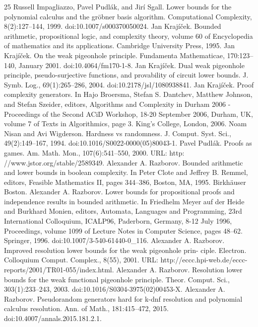 \documentclass[10pt,a4paper]{article}
\begin{document}
\begin{thebibliography}{25}
 Russell Impagliazzo, Pavel Pudlák, and Jirí Sgall. Lower bounds for the polynomial calculus and the gröbner basis algorithm. Computational Complexity, 8(2):127–144, 1999. doi:10.1007/s000370050024.
 Jan Krajíček. Bounded arithmetic, propositional logic, and complexity theory, volume 60 of Encyclopedia of mathematics and its applications. Cambridge University Press, 1995.
 Jan Krajíček. On the weak pigeonhole principle. Fundamenta Mathematicae, 170:123–140, January 2001. doi:10.4064/fm170-1-8.
 Jan Krajíček. Dual weak pigeonhole principle, pseudo-surjective functions, and provability of circuit lower bounds. J. Symb. Log., 69(1):265–286, 2004. doi:10.2178/jsl/1080938841.
 Jan Krajíček. Proof complexity generators. In Hajo Broersma, Stefan S. Dantchev, Matthew Johnson, and Stefan Szeider, editors, Algorithms and Complexity in Durham 2006 - Proceedings of the Second ACiD Workshop, 18-20 September 2006, Durham, UK, volume 7 of Texts in Algorithmics, page 3. King’s College, London, 2006.
 Noam Nisan and Avi Wigderson. Hardness vs randomness. J. Comput. Syst. Sci., 49(2):149–167, 1994. doi:10.1016/S0022-0000(05)80043-1.
 Pavel Pudlák. Proofs as games. Am. Math. Mon., 107(6):541–550, 2000. URL: http: //www.jstor.org/stable/2589349.
 Alexander A. Razborov. Bounded arithmetic and lower bounds in boolean complexity. In Peter Clote and Jeffrey B. Remmel, editors, Feasible Mathematics II, pages 344–386, Boston, MA, 1995. Birkhäuser Boston.
 Alexander A. Razborov. Lower bounds for propositional proofs and independence results in bounded arithmetic. In Friedhelm Meyer auf der Heide and Burkhard Monien, editors, Automata, Languages and Programming, 23rd International Colloquium, ICALP96, Paderborn, Germany, 8-12 July 1996, Proceedings, volume 1099 of Lecture Notes in Computer Science, pages 48–62. Springer, 1996. doi:10.1007/3-540-61440-0\_116.
 Alexander A. Razborov. Improved resolution lower bounds for the weak pigeonhole prin- ciple. Electron. Colloquium Comput. Complex., 8(55), 2001. URL: http://eccc.hpi-web.de/eccc-reports/2001/TR01-055/index.html.
 Alexander A. Razborov. Resolution lower bounds for the weak functional pigeonhole principle. Theor. Comput. Sci., 303(1):233–243, 2003. doi:10.1016/S0304-3975(02)00453-X.
 Alexander A. Razborov. Pseudorandom generators hard for k-dnf resolution and polynomial calculus resolution. Ann. of Math., 181:415–472, 2015. doi:10.4007/annals.2015.181.2.1.

\end{thebibliography}
\end{document}
